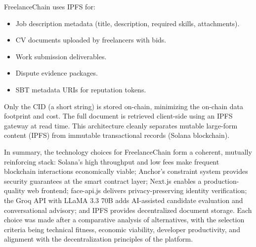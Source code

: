 FreelanceChain uses IPFS for:
\begin{itemize}
    \item Job description metadata (title, description, required skills, attachments).
    \item CV documents uploaded by freelancers with bids.
    \item Work submission deliverables.
    \item Dispute evidence packages.
    \item SBT metadata URIs for reputation tokens.
\end{itemize}

Only the CID (a short string) is stored on-chain, minimizing the on-chain data footprint and cost. The full document is retrieved client-side using an IPFS gateway at read time. This architecture cleanly separates mutable large-form content (IPFS) from immutable transactional records (Solana blockchain).

In summary, the technology choices for FreelanceChain form a coherent, mutually reinforcing stack: Solana's high throughput and low fees make frequent blockchain interactions economically viable; Anchor's constraint system provides security guarantees at the smart contract layer; Next.js enables a production-quality web frontend; face-api.js delivers privacy-preserving identity verification; the Groq API with LLaMA 3.3 70B adds AI-assisted candidate evaluation and conversational advisory; and IPFS provides decentralized document storage. Each choice was made after a comparative analysis of alternatives, with the selection criteria being technical fitness, economic viability, developer productivity, and alignment with the decentralization principles of the platform.
